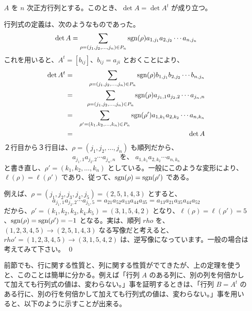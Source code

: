 \begin{thm} \label{thm:detoftranspose}
$A$ を $n$ 次正方行列とする。このとき、$\det A = \det A^t$ が成り立つ。
\end{thm}
\proof
行列式の定義は、次のようなものであった。
$$\det A = \sum_{\rho = (j_1,j_2,\ldots,j_n)\in P_n} \mbox{{\rm sgn}}(\rho)a_{1,j_1}a_{2,j_2}\cdots a_{n,j_n}$$
これを用いると、$A^t=[b_{ij}]$、$b_{ij}=a_{ji}$ とおくことにより、
\begin{eqnarray*}
\det A^t & = & \sum_{\rho = (j_1,j_2,\ldots,j_n)\in P_n} \mbox{{\rm sgn}}(\rho)b_{1,j_1}b_{2,j_2}\cdots b_{n,j_n}\\
& = & \sum_{\rho = (j_1,j_2,\ldots,j_n)\in P_n} \mbox{{\rm sgn}}(\rho)a_{j_1,1}a_{j_2,2}\cdots a_{j_n,n}\\
& = & \sum_{\rho' = (k_1,k_2,\ldots,k_n)\in P_n} \mbox{{\rm sgn}}(\rho')a_{1,k_1}a_{2,k_2}\cdots a_{n,k_n}\\
& = & \det A
\end{eqnarray*}
２行目から３行目は、$\rho = (j_1,j_2,\ldots,j_n)$ も順列だから、
$$a_{j_1,1}a_{j_2,2}\cdots a_{j_n,n}\;\mbox{ を、}\;a_{1,k_1}a_{2,k_2}\cdots a_{n,k_n}$$
と書き直し、$\rho' =(k_1,k_2,\ldots,k_n)$ としている。一般にこのような変形により、$\ell(\rho) = \ell(\rho')$ であり、従って、$\mbox{{\rm sgn}}(\rho) = \mbox{{\rm sgn}}(\rho')$ である。

例えば、$\rho = (j_1,j_2,j_3,j_4,j_5) = (2,5,1,4,3)$ とすると、
$$a_{j_1,1}a_{j_2,2}\cdots a_{j_5,5} = a_{21}a_{52}a_{13}a_{44}a_{35} = a_{13}a_{21}a_{35}a_{44}a_{52}$$
だから、$\rho' = (k_1,k_2,k_3,k_4.k_5) = (3,1,5,4,2)$ となり、$\ell(\rho) = \ell(\rho') = 5$、$\mbox{{\rm sgn}}(\rho) = \mbox{{\rm sgn}}(\rho') = -1$ となる。実は、順列 $rho$ を、$(1,2,3,4,5)\to(2,5,1,4,3)$ なる写像だと考えると、$rho' = (1,2,3,4,5)\to(3,1,5,4,2)$ は、逆写像になっています。一般の場合は考えてみて下さい。
\qed

\medskip
前節でも、行に関する性質と、列に関する性質がでてきたが、上の定理を使うと、このことは簡単に分かる。例えば「行列 $A$ のある列に、別の列を何倍かして加えても行列式の値は、変わらない。」事を証明するときは、「行列 $B = A^t$ のある行に、別の行を何倍かして加えても行列式の値は、変わらない。」事を用いると、以下のように示すことが出来る。

